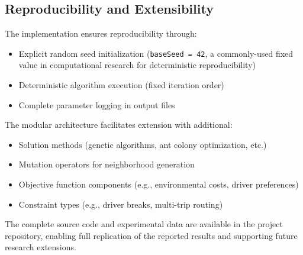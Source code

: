 \subsection{Reproducibility and Extensibility}

The implementation ensures reproducibility through:
\begin{itemize}
    \item Explicit random seed initialization (\texttt{baseSeed = 42}, a commonly-used fixed value in computational research for deterministic reproducibility)
    \item Deterministic algorithm execution (fixed iteration order)
    \item Complete parameter logging in output files
\end{itemize}

The modular architecture facilitates extension with additional:
\begin{itemize}
    \item Solution methods (genetic algorithms, ant colony optimization, etc.)
    \item Mutation operators for neighborhood generation
    \item Objective function components (e.g., environmental costs, driver preferences)
    \item Constraint types (e.g., driver breaks, multi-trip routing)
\end{itemize}

The complete source code and experimental data are available in the project repository, enabling full replication of the reported results and supporting future research extensions.
